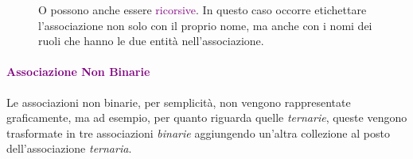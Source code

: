 \begin{figure}[h]
    \centering
    \captionsetup{justification=centering}
    \caption{O possono anche essere \textcolor{purple}{ricorsive}. In questo caso occorre etichettare l'associazione non solo con il proprio nome, ma anche con i nomi dei ruoli che hanno le due entità nell'associazione.}
\end{figure}

\paragraph{\textcolor{purple}{Associazione Non Binarie}}
Le associazioni non binarie, per semplicità, non vengono rappresentate graficamente, ma ad esempio,
per quanto riguarda quelle \emph{ternarie}, queste vengono trasformate in tre associazioni \emph{binarie} aggiungendo un'altra
collezione al posto dell'associazione \emph{ternaria}.